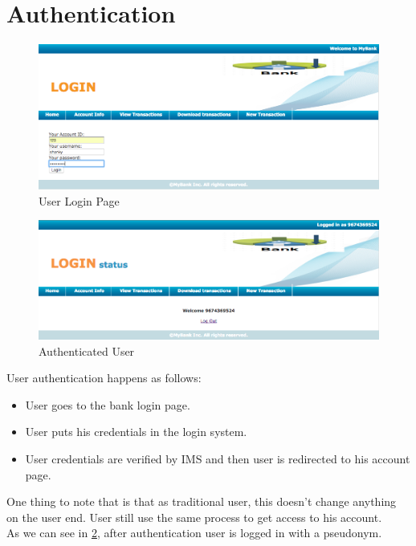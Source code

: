 \section{Authentication}
\begin{figure}[h]
	\centering
	\includegraphics[width=\textwidth]{figures/Login}
	\caption{User Login Page}
	\label{fig:Login}
\end{figure}
\begin{figure}[h]
	\centering
	\includegraphics[width=\textwidth]{figures/Logged}
	\caption{Authenticated User}
	\label{fig:Logged}
\end{figure}	
User authentication happens as follows:
\begin{itemize}
	\item User goes to the bank login page.
	\item User puts his credentials in the login system.
	\item User credentials are verified by IMS and then user is redirected to his account page.
\end{itemize}
One thing to note that is that as traditional user, this doesn't change anything on the user end. User still use the same process to get access to his account.
\\As we can see in \ref{fig:Logged}, after authentication user is logged in with a pseudonym.	
